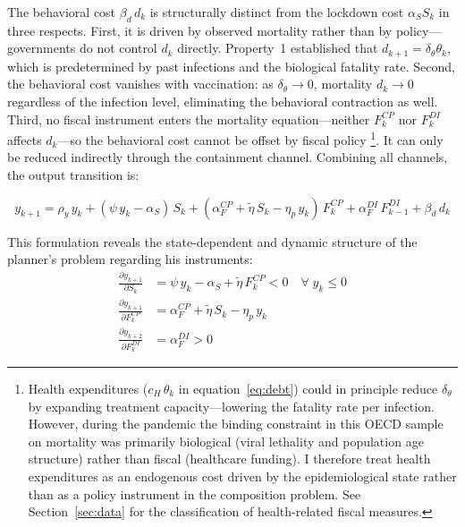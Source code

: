 \noindent The behavioral cost $\beta_d\, d_k$ is structurally distinct from the lockdown cost $\alpha_S S_k$ in three respects. First, it is driven by observed mortality rather than by policy---governments do not control $d_k$ directly. Property~1 established that $d_{k+1} = \delta_\theta \theta_k$, which is predetermined by past infections and the biological fatality rate. Second, the behavioral cost vanishes with vaccination: as $\delta_\theta \to 0$, mortality $d_k \to 0$ regardless of the infection level, eliminating the behavioral contraction as well. Third, no fiscal instrument enters the mortality equation---neither $F^{CP}_k$ nor $F^{DI}_k$ affects $d_k$---so the behavioral cost cannot be offset by fiscal policy \footnote{Health expenditures ($c_H\,\theta_k$ in 
equation~\ref{eq:debt}) could in principle reduce $\delta_\theta$ 
by expanding treatment capacity---lowering the fatality rate per 
infection. However, during the pandemic the binding constraint in this OECD sample on mortality was primarily biological (viral lethality and population 
age structure) rather than fiscal (healthcare funding). I therefore 
treat health expenditures as an endogenous cost driven by the 
epidemiological state rather than as a policy instrument in the 
composition problem. See Section~\ref{sec:data} for the 
classification of health-related fiscal measures.}. It can only be reduced indirectly through the containment channel. Combining all channels, the output transition is:


%
\begin{equation}{
    y_{k+1} = \rho_y\, y_k + (\psi\, y_k - \alpha_S)\, S_k + (\alpha^{CP}_F + \tilde{\eta}\, S_k - \eta_p\, y_k)\, F^{CP}_k + \alpha^{DI}_F\,F^{DI}_{k-1} + \beta_d\, d_k
}
\label{eq:output}
\end{equation}
%

\noindent This formulation reveals the state-dependent and dynamic structure of the planner's problem regarding his instruments:
%
\begin{align}
    \frac{\partial y_{k+1}}{\partial S_k} &= \psi\, y_k - \alpha_S + \tilde{\eta}\, F^{CP}_k < 0 \quad \forall\; y_k \leq 0
    \label{eq:marginal_S} \\[6pt]
    \frac{\partial y_{k+1}}{\partial F^{CP}_k} &= \alpha^{CP}_F + \tilde{\eta}\, S_k - \eta_p\, y_k
    \label{eq:marginal_CP} \\[6pt]
    \frac{\partial y_{k+2}}{\partial F^{DI}_k} &= \alpha^{DI}_F > 0
    \label{eq:marginal_DI}
\end{align}

